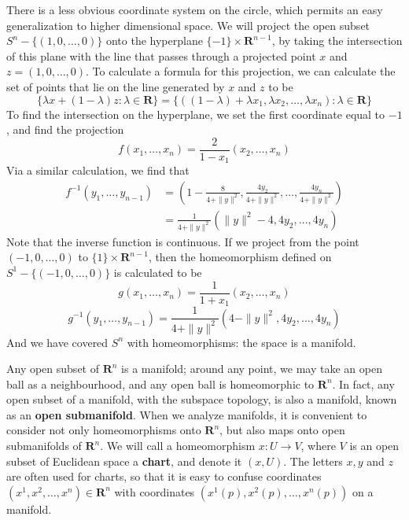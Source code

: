 \begin{example}
    There is a less obvious coordinate system on the circle, which permits an easy generalization to higher dimensional space. We will project the open subset $S^n - \{(1,0,\dots,0)\}$ onto the hyperplane $\{-1\} \times \mathbf{R}^{n-1}$, by taking the intersection of this plane with the line that passes through a projected point $x$ and $z = (1,0, \dots, 0)$. To calculate a formula for this projection, we can calculate the set of points that lie on the line generated by $x$ and $z$ to be
    \[ \{ \lambda x + (1 - \lambda) z : \lambda \in \mathbf{R} \} = \{ ((1 - \lambda) + \lambda x_1, \lambda x_2, \dots, \lambda x_n) : \lambda \in \mathbf{R} \} \]
    To find the intersection on the hyperplane, we set the first coordinate equal to $-1$, and find the projection
    \[ f(x_1, \dots, x_n) = \frac{2}{1 - x_1}(x_2, \dots, x_n) \]
    Via a similar calculation, we find that
    \begin{align*}
        f^{-1}(y_1, \dots, y_{n-1}) &= \left(1 - \frac{8}{4 + \| y \|^2}, \frac{4y_2}{4 + \| y \|^2}, \dots, \frac{4y_n}{4 + \| y \|^2} \right)\\
        &= \frac{1}{4 + \| y \|^2} \left( \| y \|^2 - 4, 4y_2, \dots, 4y_n \right)
    \end{align*}
    Note that the inverse function is continuous. If we project from the point $(-1,0,\dots,0)$ to $\{ 1 \} \times \mathbf{R}^{n-1}$, then the homeomorphism defined on $S^1 - \{ (-1,0,\dots,0) \}$ is calculated to be
    \[ g(x_1, \dots, x_n) = \frac{1}{1 + x_1}(x_2, \dots, x_n) \]
    \[ g^{-1}(y_1, \dots, y_{n-1}) = \frac{1}{4 + \| y \|^2} \left( 4 - \| y \|^2, 4y_2, \dots, 4y_n \right) \]
    And we have covered $S^n$ with homeomorphisms: the space is a manifold.
\end{example}

Any open subset of $\mathbf{R}^n$ is a manifold; around any point, we may take an open ball as a neighbourhood, and any open ball is homeomorphic to $\mathbf{R}^n$. In fact, any open subset of a manifold, with the subspace topology, is also a manifold, known as an {\bf open submanifold}. When we analyze manifolds, it is convenient to consider not only homeomorphisms onto $\mathbf{R}^n$, but also maps onto open submanifolds of $\mathbf{R}^n$. We will call a homeomorphism $x: U \to V$, where $V$ is an open subset of Euclidean space a {\bf chart}, and denote it $(x,U)$. The letters $x,y$ and $z$ are often used for charts, so that it is easy to confuse coordinates $(x^1,x^2, \dots, x^n) \in \mathbf{R}^n$ with coordinates $(x^1(p), x^2(p), \dots, x^n(p))$ on a manifold.

